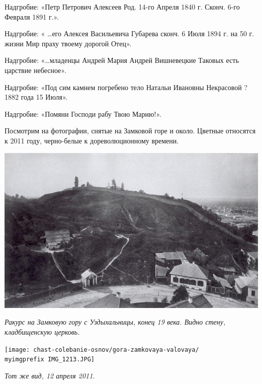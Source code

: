 Надгробие: «Петр Петрович Алексеев Род. 14-го Апреля 1840 г. Сконч. 6-го Февраля 1891 г.».

Надгробие: « …его Алексея Васильевича Губарева 
сконч. 6 Июля 1894 г. на 50 г. жизни Мир праху твоему дорогой Отец».

Надгробие: «…младенцы Андрей Мария Андрей
Вишневецкие Таковых есть царствие небесное».

Надгробие: «Под сим камнем погребено тело Натальи Ивановны Некрасовой ? 1882 года 15 Июля».

Надгробие: «Помяни Господи рабу Твою Марию!».

Посмотрим на фотографии, снятые на Замковой горе и около. Цветные относятся к 2011 году, черно-белые к дореволюционному времени.

\newpage
\vspace*{\fill}
\begin{center}
\includegraphics[width=\linewidth]{chast-colebanie-osnov/gora-zamkovaya-valovaya/zamkovaya_s_uzd.jpg}

\textit{Ракурс на Замковую гору с Уздыхальницы, конец 19 века. Видно стену, кладбищенскую церковь.}
\end{center}

\begin{center}
\texttt{[image: chast-colebanie-osnov/gora-zamkovaya-valovaya/\\myimgprefix IMG\_1213.JPG]}

\textit{Тот же вид, 12 апреля 2011.}
\end{center}
\vspace*{\fill}
\newpage

